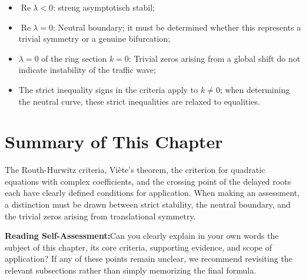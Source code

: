 \documentclass[11pt,a4paper,openany]{book}
\numberwithin{equation}{chapter}
\numberwithin{figure}{chapter}
\numberwithin{table}{chapter}
\newcommand{\sectionwrapup}[1]{%
  \section{Summary of This Chapter}
  \begin{tcolorbox}[summarybox,title=\textbf{Chapter Review}]
  #1
  \par\smallskip
  \textbf{Reading Self-Assessment:}Can you clearly explain in your own words the subject of this chapter, its core criteria, supporting evidence, and scope of application? If any of these points remain unclear, we recommend revisiting the relevant subsections rather than simply memorizing the final formula.
\end{tcolorbox}
  \clearpage
}
\begin{document}
\begin{itemize}[leftmargin=1.4em,itemsep=3pt]
\item




 $\operatorname{Re}\lambda<0$: streng asymptotisch stabil;


\item

$\operatorname{Re}\lambda=0$: Neutral boundary; it must be determined whether this represents a trivial symmetry or a genuine bifurcation;









\item






$\lambda=0$ of the ring section $k=0$: Trivial zeros arising from a global shift do not indicate instability of the traffic wave;









\item






The strict inequality signs in the criteria apply to $k\ne0$; when determining the neutral curve, these strict inequalities are relaxed to equalities.









\end{itemize}

\sectionwrapup{The Routh-Hurwitz criteria, Viète's theorem, the criterion for quadratic equations with complex coefficients, and the crossing point of the delayed roots each have clearly defined conditions for application. When making an assessment, a distinction must be drawn between strict stability, the neutral boundary, and the trivial zeros arising from translational symmetry.}
\end{document}
